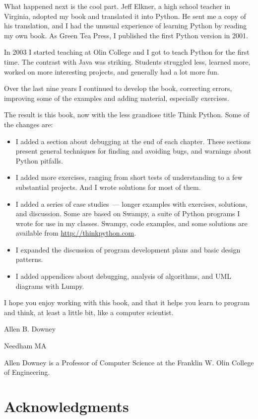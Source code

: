 What happened next is the cool part. Jeff Elkner, a high school teacher in
Virginia, adopted my book and translated it into Python. He sent me a copy of
his translation, and I had the unusual experience of learning Python by reading
my own book. As Green Tea Press, I published the first Python version in 2001.

In 2003 I started teaching at Olin College and I got to teach Python for the
first time. The contrast with Java was striking. Students struggled less,
learned more, worked on more interesting projects, and generally had a lot more
fun.

Over the last nine years I continued to develop the book, correcting errors,
improving some of the examples and adding material, especially exercises.

The result is this book, now with the less grandiose title Think Python. Some of
the changes are:

\begin{itemize}
\item I added a section about debugging at the end of each chapter. These
sections present general techniques for finding and avoiding bugs, and warnings
about Python pitfalls.
\item I added more exercises, ranging from short tests of understanding to a few
substantial projects. And I wrote solutions for most of them.
\item I added a series of case studies\ --- longer examples with exercises,
solutions, and discussion. Some are based on Swampy, a suite of Python programs
I wrote for use in my classes. Swampy, code examples, and some solutions are
available from \url{http://thinkpython.com}.
\item I expanded the discussion of program development plans and basic design
patterns.
\item I added appendices about debugging, analysis of algorithms, and UML
diagrams with Lumpy.
\end{itemize}

\bigskip
I hope you enjoy working with this book, and that it helps you learn to program
and think, at least a little bit, like a computer scientist.

\bigskip
Allen B. Downey 

Needham MA 

\bigskip
Allen Downey is a Professor of Computer Science at the Franklin W. Olin College
of Engineering.

\section{Acknowledgments}

